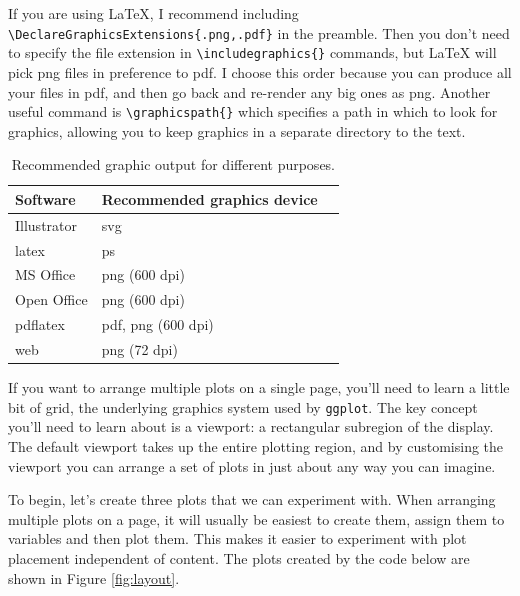 If you are using LaTeX, I recommend including
\texttt{\textbackslash{}DeclareGraphicsExtensions\{.png,.pdf\}} in the
preamble. Then you don't need to specify the file extension in
\texttt{\textbackslash{}includegraphics\{\}} commands, but LaTeX will
pick png files in preference to pdf.  I choose
this order because you can produce all your files in pdf, and then go
back and re-render any big ones as png. Another useful command is
\texttt{\textbackslash{}graphicspath\{\}} which specifies a path in
which to look for graphics, allowing you to keep graphics in a separate
directory to the text.

\begin{table}
  \begin{center}
  \begin{tabular}{lll}
    \toprule
    Software & Recommended graphics device \\
    \midrule
    Illustrator & svg \\
    latex & ps \\
    MS Office & png (600 dpi) \\
    Open Office & png (600 dpi) \\
    pdflatex & pdf, png (600 dpi) \\
    web & png (72 dpi) \\
    \bottomrule 
  \end{tabular}
  \end{center}
  \caption{Recommended graphic output for different purposes.}
  \label{tbl:graphic-recommendation}
\end{table}


If you want to arrange multiple plots on a single page, you'll need to
learn a little bit of grid, the underlying graphics system used by
\texttt{ggplot}. The key concept you'll need to learn about is a
viewport: a rectangular subregion of the display. The default viewport
takes up the entire plotting region, and by customising the viewport you
can arrange a set of plots in just about any way you can imagine.
 

To begin, let's create three plots that we can experiment with. When
arranging multiple plots on a page, it will usually be easiest to create
them, assign them to variables and then plot them. This makes it easier
to experiment with plot placement independent of content. The plots
created by the code below are shown in Figure \ref{fig:layout}.

